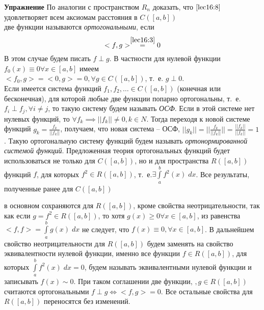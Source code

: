 \documentclass[../../main.tex]{subfiles}
\begin{document}
	\textbf{Упражнение} По аналогии с пространством $R_n$ доказать, что
	 $\eqref{lec16:8}$ удовлетворяет всем аксиомам расстояния в $C(\left[a, 
	 b\right])$\\
	две функции называются \emph{ортогональными}, если
	\begin{equation} 
	\label{lec16:9}
	<f, g> \stackrel{\eqref{lec16:3}}{=} 0
	\end{equation}
	 В этом случае будем писать $f \perp g$. В частности для нулевой функции 
	 $f_0(x)
	  \equiv 0 \forall x \in \left[a, b\right]$ имеем\\
	 $<f_0, g> = <0, g> = 0, \forall g \in C(\left[a, b\right])$, т.~е. $g\perp 
	 0$.\\
	 Если имеется система функций $f_1, f_2, \ldots \in  C(\left[a, b\right]) $
	  (конечная или бесконечная), для которой любые две функции попарно 
	  ортогональны,
	   т.~е. $f_i \perp f_j, \forall i \neq j$, то такую систему будем называть 
	   \emph{ОСФ}.
	    Если в этой системе нет нулевых функций, то $\forall f_k \implies ||f_k||
	     \neq 0, k \in N $. Тогда переходя к новой системе функций $g_k =
	      \frac{f_k}{||f_k||}$, получаем, что новая система \--- ОСФ, $||g_k|| =
	       ||\frac{f_k}{||f_k||}|| = \frac{||f_k||}{||f_k||} = 1$. Такую 
	       ортогональную
	        систему функций будем называть \emph{ортонормированной системой 
	        функций}.
	 Предложенная теория ортогональных функций будет использоваться не только для
	  $C(\left[a, b\right])$, но и для пространства $R(\left[a, b\right])$ 
	  функций $f$,
	  	   для которых $f^2 \in R(\left[a, b\right])$, т.~е.$\exists 
	  	   \int\limits_a^b
   		f^2(x)\; dx$. Все результаты, полученные ранее для $C(\left[a, b\right])$ 
   		
   		в
	    основном сохраняются для $R(\left[a, b\right])$, кроме свойства
	     неотрицательности, так как  если $g = f^2 \in R(\left[a, b\right])$, то 
	     хотя
	     $g(x) \ge 0 \forall x \in \left[a, b\right]$, из равенства $<f,f> =
	     \int\limits_a^b g(x)\; dx$ не следует, что $f(x) \equiv 0, \forall x \in
      \left[a, b\right]$. В дальнейшем свойство неотрицательности для 
      $R(\left[a,
      b\right])$ будем заменять на свойство эквивалентности нулевой функции,   
      именно
       все функции $f \in R(\left[a, b\right])$, для которых
      $\int\limits_a^b f^2(x)\; dx = 0$, будем называть эквивалентными нулевой
      функции и записывать $f(x) \sim 0$. При таком соглашении две функции, $,
	            g \in R(\left[a, b\right])$ считаются ортогональными $f \perp g
	             \iff <f, g> = 0$. Все остальные свойства для $R(\left[a,
	              b\right])$ переносятся без изменений.
\end{document}
